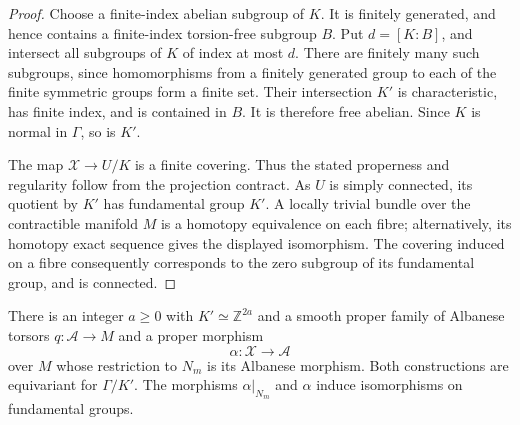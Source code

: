 \begin{proof}
Choose a finite-index abelian subgroup of $K$.  It is finitely generated,
and hence contains a finite-index torsion-free subgroup $B$.  Put
$d=[K:B]$, and intersect all subgroups of $K$ of index at most $d$.
There are finitely many such subgroups, since homomorphisms from a
finitely generated group to each of the finite symmetric groups form
a finite set.  Their intersection $K'$ is characteristic, has finite
index, and is contained in $B$.  It is therefore free abelian.
Since $K$ is normal in $\Gamma$, so is $K'$.

The map $\mathcal X\to U/K$ is a finite covering.  Thus the stated
properness and regularity follow from the projection contract.  As
$U$ is simply connected, its quotient by $K'$ has fundamental group
$K'$.  A locally trivial bundle over the contractible manifold $M$
is a homotopy equivalence on each fibre; alternatively, its homotopy
exact sequence gives the displayed isomorphism.  The covering induced
on a fibre consequently corresponds to the zero subgroup of its
fundamental group, and is connected.
\end{proof}

\begin{lemma}
\label{cmp:albanese}
There is an integer $a\geq0$ with $K'\simeq\mathbb Z^{2a}$ and a smooth proper family of
Albanese torsors $q:\mathcal A\to M$ and a proper morphism
\[
                 \alpha:\mathcal X\longrightarrow\mathcal A
\]
over $M$ whose restriction to $N_m$ is its Albanese morphism.  Both
constructions are equivariant for $\Gamma/K'$.  The morphisms
$\alpha|_{N_m}$ and $\alpha$ induce isomorphisms on fundamental groups.
\end{lemma}


